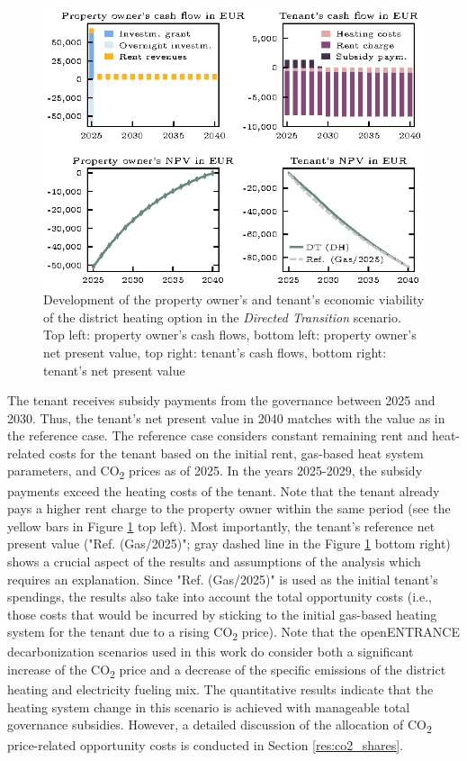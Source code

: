 \begin{figure}[h]
	\centering
	\includegraphics[width=0.9\linewidth]{figures/4_Results/fig_DT_DH/detail.eps}
	\caption{Development of the property owner's and tenant's economic viability of the district heating option in the \textit{Directed Transition} scenario. Top left: property owner's cash flows, bottom left: property owner's net present value, top right: tenant's cash flows, bottom right: tenant's net present value}
	\label{fig:dt+dh}
\end{figure}

 The tenant receives subsidy payments from the governance between 2025 and 2030. Thus, the tenant's net present value in 2040 matches with the value as in the reference case. The reference case considers constant remaining rent and heat-related costs for the tenant based on the initial rent, gas-based heat system parameters, and CO\textsubscript{2} prices as of 2025. In the years 2025-2029, the subsidy payments exceed the heating costs of the tenant. Note that the tenant already pays a higher rent charge to the property owner within the same period (see the yellow bars in Figure \ref{fig:dt+dh} top left). Most importantly, the tenant's reference net present value ("Ref. (Gas/2025)"; gray dashed line in the Figure \ref{fig:dt+dh} bottom right) shows a crucial aspect of the results and assumptions of the analysis which requires an explanation. Since "Ref. (Gas/2025)" is used as the initial tenant's spendings, the results also take into account the total opportunity costs (i.e., those costs that would be incurred by sticking to the initial gas-based heating system for the tenant due to a rising CO\textsubscript{2} price). Note that the openENTRANCE decarbonization scenarios used in this work do consider both a significant increase of the CO\textsubscript{2} price and a decrease of the specific emissions of the district heating and electricity fueling mix. The quantitative results indicate that the heating system change in this scenario is achieved with manageable total governance subsidies. However, a detailed discussion of the allocation of CO\textsubscript{2} price-related opportunity costs is conducted in Section \ref{res:co2_shares}.


